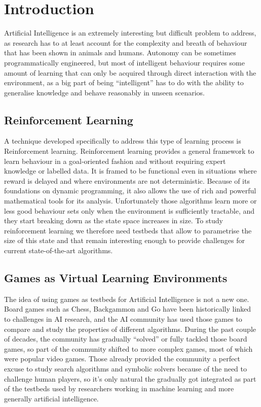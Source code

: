 
\chapter{Introduction}

Artificial Intelligence is an extremely interesting but difficult problem to
address, as research has to at least account for the complexity and breath of
behaviour that has been shown in animals and humans. Autonomy can be sometimes
programmatically engineered, but most of intelligent behaviour requires some
amount of learning that can only be acquired through direct interaction with the
environment, as a big part of being ``intelligent'' has to do with the ability
to generalise knowledge and behave reasonably in unseen scenarios.

\section{Reinforcement Learning}

A technique developed specifically to address this type of learning process is
Reinforcement learning. Reinforcement learning provides a general framework to
learn behaviour in a goal-oriented fashion and without requiring expert
knowledge or labelled data. It is framed to be functional even in situations
where reward is delayed and where environments are not deterministic. Because of
its foundations on dynamic programming, it also allows the use of rich and
powerful mathematical tools for its analysis. Unfortunately those algorithms
learn more or less good behaviour sets only when the environment is sufficiently
tractable, and they start breaking down as the state space increases in size. To
study reinforcement learning we therefore need testbeds that allow to
parametrise the size of this state and that remain interesting enough to provide
challenges for current state-of-the-art algorithms.

\section{Games as Virtual Learning Environments}

The idea of using games as testbeds for Artificial Intelligence is not a new
one. Board games such as Chess, Backgammon and Go have been historically linked
to challenges in AI research, and the AI community has used those games to
compare and study the properties of different algorithms. During the past couple
of decades, the community has gradually ``solved'' or fully tackled those board
games, so part of the community shifted to more complex games, most of which
were popular video games. Those already provided the community a perfect excuse
to study search algorithms and symbolic solvers because of the need to challenge
human players, so it's only natural the gradually got integrated as part of the
testbeds used by researchers working in machine learning and more generally
artificial intelligence.


